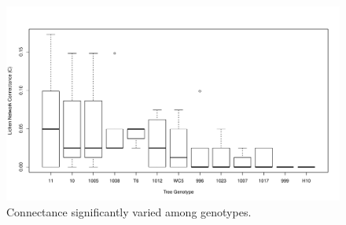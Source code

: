 \documentclass[9pt,twocolumn,twoside,lineno]{pnas-new}
\begin{document}
{%





\begin{figure}[ht]
\centering
\includegraphics[width=\linewidth]{connect_geno.pdf}
\caption{Connectance significantly varied among genotypes.}
\label{fig:connect}
\end{figure}


}
\end{document}
